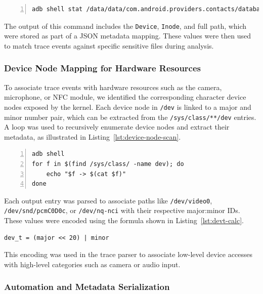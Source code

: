 \documentclass[a4paper,12pt]{report}
\begin{document}
\begin{lstlisting}[language=sh,caption={Retrieving inode and device ID for a database file},label={lst:db-stat},numbers=left]
adb shell stat /data/data/com.android.providers.contacts/databases/contacts2.db
\end{lstlisting}

The output of this command includes the \texttt{Device}, \texttt{Inode}, and full path, which were stored as part of a JSON metadata mapping. These values were then used to match trace events against specific sensitive files during analysis.

\subsubsection{Device Node Mapping for Hardware Resources}

To associate trace events with hardware resources such as the camera, microphone, or NFC module, we identified the corresponding character device nodes exposed by the kernel. Each device node in \texttt{/dev} is linked to a major and minor number pair, which can be extracted from the \texttt{/sys/class/**/dev} entries. A loop was used to recursively enumerate device nodes and extract their metadata, as illustrated in Listing~\ref{lst:device-node-scan}.

\begin{lstlisting}[caption={Enumerating character and block devices with major:minor IDs},label={lst:device-node-scan},numbers=left]
adb shell
for f in $(find /sys/class/ -name dev); do
    echo "$f -> $(cat $f)"
done
\end{lstlisting}

Each output entry was parsed to associate paths like \texttt{/dev/video0}, \texttt{/dev/snd/pcmC0D0c}, or \texttt{/dev/nq-nci} with their respective major:minor IDs. These values were encoded using the formula shown in Listing~\ref{lst:devt-calc}.

\begin{lstlisting}[caption={Encoding device number using major and minor},label={lst:devt-calc},numbers=none]
dev_t = (major << 20) | minor
\end{lstlisting}

This encoding was used in the trace parser to associate low-level device accesses with high-level categories such as camera or audio input.

\subsubsection{Automation and Metadata Serialization}
\end{document}
